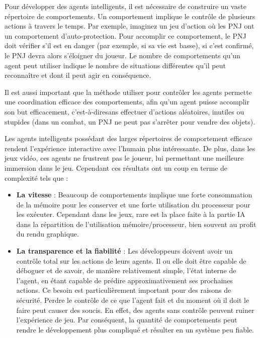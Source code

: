 \documentclass[a4paper, 12pt]{article} %
\begin{document}
Pour développer des agents intelligents, il est nécessaire de construire un vaste répertoire de comportements. Un comportement implique le contrôle de plusieurs actions à travers le temps. Par exemple, imaginez un jeu d’action où les PNJ ont un comportement d’auto-protection. Pour accomplir ce comportement, le PNJ doit vérifier s’il est en danger (par exemple, si sa vie est basse), si c’est confirmé, le PNJ devra alors s’éloigner du joueur. Le nombre de comportements qu’un agent peut utiliser indique le nombre de situations différentes qu’il peut reconnaître et dont il peut agir en conséquence.

Il est aussi important que la méthode utiliser pour contrôler les agents permette une coordination efficace des comportements, afin qu’un agent puisse accomplir son but efficacement, c’est-à-diresans effectuer d’actions aléatoires, inutiles ou stupides (dans un combat, un PNJ ne peut pas s’arrêter pour vendre des objets).

Les agents intelligents possédant des larges répertoires de comportement efficace rendent l’expérience interactive avec l’humain plus intéressante. De plus, dans les jeux vidéo, ces agents ne frustrent pas le joueur, lui permettant une meilleure immersion dans le jeu. Cependant ces résultats ont un coup en terme de complexité tels que\cite{bt} :

\begin{itemize}
	\item \textbf{La vitesse} : Beaucoup de comportements implique une forte consommation de la mémoire pour les conserver et une forte utilisation du processeur pour les exécuter. Cependant dans les jeux, rare est la place faite à la partie IA dans la répartition de l’utilisation mémoire/processeur, bien souvent au profit du rendu graphique.
	\item \textbf{La transparence et la fiabilité} : Les développeurs doivent avoir un contrôle total sur les actions de leurs agents. Il ou elle doit être capable de déboguer et de savoir, de manière relativement simple, l’état interne de l’agent, en étant capable de prédire approximativement ses prochaines actions. Ce besoin est particulièrement important pour des raisons de sécurité. Perdre le contrôle de ce que l’agent fait et du moment où il doit le faire peut causer des soucis. En effet, des agents sans contrôle peuvent ruiner l’expérience de jeu. Par conséquent, la quantité de comportements peut rendre le développement plus compliqué et résulter en un système peu fiable.
\end{itemize}
\end{document}

